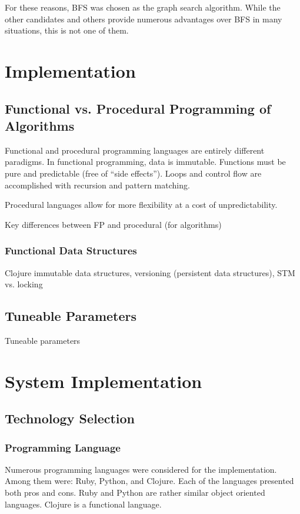 \documentclass[12pt,letterpaper,oneside,notitlepage]{report}
\theoremstyle{definition}
\begin{document}
      For these reasons, BFS was chosen as the graph search algorithm.  While the other candidates and others provide numerous advantages over BFS in many situations, this is not one of them.
  
  \chapter{Implementation}
    \section{Functional vs. Procedural Programming of Algorithms}
      Functional and procedural programming languages are entirely different paradigms.  In functional programming, data is immutable.  Functions must be pure and predictable (free of ``side effects'').  Loops and control flow are accomplished with recursion and pattern matching.
      
      Procedural languages allow for more flexibility at a cost of unpredictability.  
      
      Key differences between FP and procedural (for algorithms)
      
      \subsection{Functional Data Structures}
        Clojure immutable data structures, versioning (persistent data structures), STM vs. locking
      
    \section{Tuneable Parameters}
      Tuneable parameters
  
  \chapter{System Implementation}
    \section{Technology Selection}
      
      
      \subsection{Programming Language}
        Numerous programming languages were considered for the implementation.  Among them were:  Ruby, Python, and Clojure.  Each of the languages presented both pros and cons.  Ruby and Python are rather similar object oriented languages.  Clojure is a functional language.
        
\end{document}
